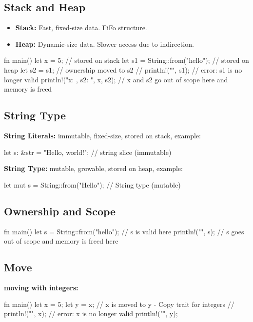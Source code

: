 \documentclass[8pt,a4paper,twocolumn]{extarticle}
\begin{document}
\subsection{Stack and Heap}
\begin{itemize}
  \item \textbf{Stack:} Fast, fixed-size data. FiFo structure.
  \item \textbf{Heap:} Dynamic-size data. Slower access due to indirection.
\end{itemize}
\begin{Code}
fn main() {
    let x = 5;              // stored on stack
    let s1 = String::from("hello"); // stored on heap
    let s2 = s1;           // ownership moved to s2
    // println!("{}", s1);  // error: s1 is no longer valid
    println!("x: {}, s2: {}", x, s2);
} // x and s2 go out of scope here and memory is freed
\end{Code}


\subsection{String Type}
\textbf{String Literals:} immutable, fixed-size, stored on stack, example:
\begin{Code}    
let s: &str = "Hello, world!"; // string slice (immutable)
\end{Code}

\textbf{String Type:} mutable, growable, stored on heap, example:
\begin{Code}
let mut s = String::from("Hello"); // String type (mutable)
\end{Code}

\subsection{Ownership and Scope}
\begin{Code}
fn main() {
    {
        let s = String::from("hello"); // s is valid here
        println!("{}", s);
    } // s goes out of scope and memory is freed here
}
\end{Code}

\subsection{Move}
\textbf{moving with integers:}
\begin{Code}
fn main() {
    let x = 5;
    let y = x; // x is moved to y - Copy trait for integers
    // println!("{}", x); // error: x is no longer valid
    println!("{}", y);
}
\end{Code}
\end{document}
